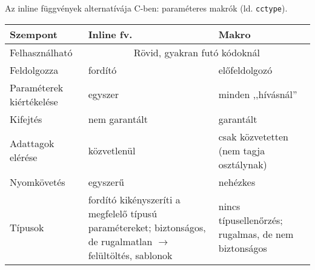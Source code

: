 \documentclass[usenames,dvipsnames,aspectratio=169]{beamer}
\begin{document}
\begin{frame}
    \begin{exampleblock}{}
        \small
        
    \end{exampleblock}
\end{frame}

\begin{frame}
    \begin{exampleblock}{}
        \small
        
    \end{exampleblock}
\end{frame}

\begin{frame}
    Az inline függvények alternatívája C-ben: paraméteres makrók (ld. \texttt{cctype}).
    \begin{exampleblock}{}
        \scriptsize
        
    \end{exampleblock}
\end{frame}

\begin{frame}
    \begin{center}
        \begin{tabular}{ p{2.5cm}|p{5cm}|p{5cm} } 
        Szempont & Inline fv. & Makro \\
        \hline
        Felhasználható & \multicolumn{2}{c}{Rövid, gyakran futó kódoknál} \\
        Feldolgozza & fordító & előfeldolgozó \\ 
        Paraméterek kiértékelése & egyszer & minden ,,hívásnál'' \\ 
        Kifejtés & nem garantált & garantált \\ 
        Adattagok elérése & közvetlenül & csak közvetetten (nem tagja osztálynak) \\ 
        Nyomkövetés & egyszerű & nehézkes \\
        Típusok & fordító kikényszeríti a megfelelő típusú paramétereket; biztonságos, de rugalmatlan $\to$ felültöltés, sablonok & nincs típusellenőrzés; rugalmas, de nem biztonságos \\
        \end{tabular}
    \end{center}
\end{frame}
\end{document}
